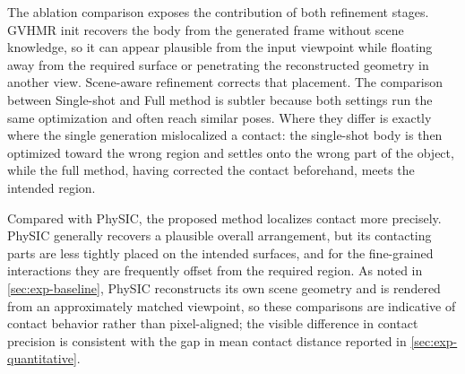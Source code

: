 The ablation comparison exposes the contribution of both refinement stages. GVHMR init recovers the body from the generated frame without scene knowledge, so it can appear plausible from the input viewpoint while floating away from the required surface or penetrating the reconstructed geometry in another view. Scene-aware refinement corrects that placement. The comparison between Single-shot and Full method is subtler because both settings run the same optimization and often reach similar poses. Where they differ is exactly where the single generation mislocalized a contact: the single-shot body is then optimized toward the wrong region and settles onto the wrong part of the object, while the full method, having corrected the contact beforehand, meets the intended region.

Compared with PhySIC, the proposed method localizes contact more precisely. PhySIC generally recovers a plausible overall arrangement, but its contacting parts are less tightly placed on the intended surfaces, and for the fine-grained interactions they are frequently offset from the required region. As noted in \cref{sec:exp-baseline}, PhySIC reconstructs its own scene geometry and is rendered from an approximately matched viewpoint, so these comparisons are indicative of contact behavior rather than pixel-aligned; the visible difference in contact precision is consistent with the gap in mean contact distance reported in \cref{sec:exp-quantitative}.

